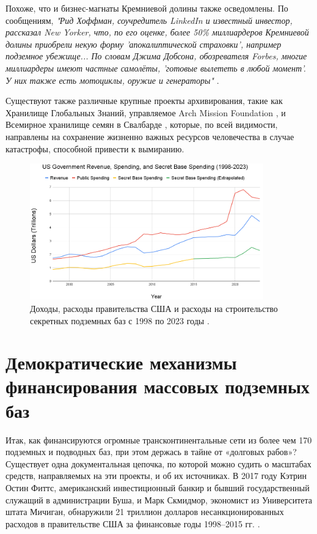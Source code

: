 \documentclass[10pt,twocolumn,letterpaper]{article}
\begin{document}
Похоже, что и бизнес-магнаты Кремниевой долины также осведомлены. По сообщениям, \textit{"Рид Хоффман, соучредитель LinkedIn и известный инвестор, рассказал New Yorker, что, по его оценке, более 50\% миллиардеров Кремниевой долины приобрели некую форму 'апокалиптической страховки', например подземное убежище... По словам Джима Добсона, обозревателя Forbes, многие миллиардеры имеют частные самолёты, 'готовые вылететь в любой момент'. У них также есть мотоциклы, оружие и генераторы"} \cite{28}.

Существуют также различные крупные проекты архивирования, такие как Хранилище Глобальных Знаний, управляемое Arch Mission Foundation \cite{29}, и Всемирное хранилище семян в Свалбарде \cite{30}, которые, по всей видимости, направлены на сохранение жизненно важных ресурсов человечества в случае катастрофы, способной привести к вымиранию.
\begin{figure}[t]
\begin{center}
\includegraphics[width=0.9\textwidth]{govcrop2.png}
\end{center}
   \caption{Доходы, расходы правительства США и расходы на строительство секретных подземных баз с 1998 по 2023 годы \cite{19}.}
   \label{fig:9}
\end{figure}

\section{Демократические механизмы финансирования массовых подземных баз}

Итак, как финансируются огромные трансконтинентальные сети из более чем 170 подземных и подводных баз, при этом держась в тайне от «долговых рабов»? Существует одна документальная цепочка, по которой можно судить о масштабах средств, направляемых на эти проекты, и об их источниках. В 2017 году Кэтрин Остин Фиттс, американский инвестиционный банкир и бывший государственный служащий в администрации Буша, и Марк Скмидмор, экономист из Университета штата Мичиган, обнаружили 21 триллион долларов несанкционированных расходов в правительстве США за финансовые годы 1998–2015 гг. \cite{11,12,13}.
\end{document}
